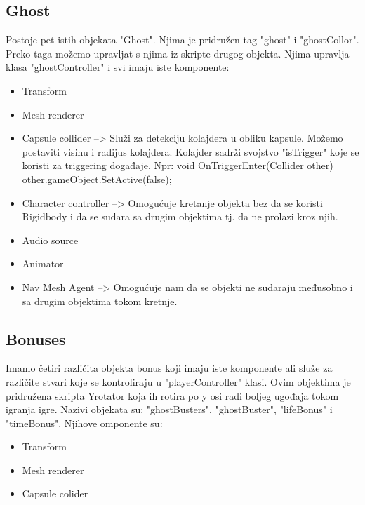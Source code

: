 \subsection{Ghost}
Postoje pet istih objekata "Ghost". Njima je pridružen tag "ghost" i "ghostCollor". Preko taga možemo upravljat s njima iz skripte drugog objekta. Njima upravlja klasa "ghostController" i svi imaju iste komponente:

\begin{itemize}
\item Transform

\item Mesh renderer

\item Capsule collider --> Služi za detekciju kolajdera u obliku kapsule. Možemo postaviti visinu i radijus kolajdera. Kolajder sadrži svojstvo "isTrigger" koje se koristi za triggering događaje.
Npr:
void OnTriggerEnter(Collider other)
{
	other.gameObject.SetActive(false);
}


\item Character controller --> Omogućuje kretanje objekta bez da se koristi Rigidbody i da se sudara sa drugim objektima tj. da ne prolazi kroz njih.

\item Audio source

\item Animator

\item Nav Mesh Agent --> Omogućuje nam da se objekti ne sudaraju međusobno i sa drugim objektima tokom kretnje.

\end{itemize}

\subsection{Bonuses}
Imamo četiri različita objekta bonus koji imaju iste komponente ali služe za različite stvari koje se kontroliraju u "playerController" klasi. Ovim objektima je pridružena skripta Yrotator koja ih rotira po y osi radi boljeg ugođaja tokom igranja igre. Nazivi objekata su: "ghostBusters", "ghostBuster", "lifeBonus" i "timeBonus". Njihove omponente su:

\begin{itemize}
\item Transform

\item Mesh renderer

\item Capsule colider

\end{itemize}

